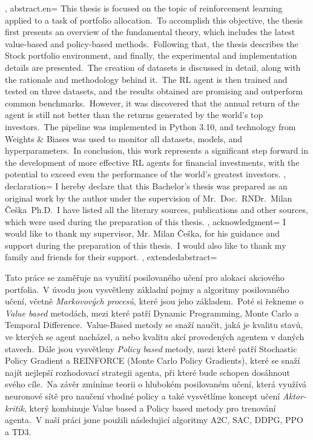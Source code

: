 {{    }, %
    abstract.en={
        This thesis is focused on the topic of reinforcement learning applied to a task of portfolio allocation.\ To accomplish this objective, the thesis first presents an overview of the fundamental theory, which includes the latest value-based and policy-based methods.\ Following that, the thesis describes the Stock portfolio environment, and finally, the experimental and implementation details are presented.\ The creation of datasets is discussed in detail, along with the rationale and methodology behind it.\ The RL agent is then trained and tested on three datasets, and the results obtained are promising and outperform common benchmarks.\ However, it was discovered that the annual return of the agent is still not better than the returns generated by the world's top investors.\ The pipeline was implemented in Python 3.10, and technology from Weights \& Biases was used to monitor all datasets, models, and hyperparameters.\ In conclusion, this work represents a significant step forward in the development of more effective RL agents for financial investments, with the potential to exceed even the performance of the world's greatest investors.
    }, %
    declaration={
        I hereby declare that this Bachelor's thesis was prepared as an original work by the author under the supervision of Mr.~Doc.~RNDr.~Milan Češka~Ph.D.\ I have listed all the literary sources, publications and other sources, which were used during the preparation of this thesis.
    },
%
    acknowledgment={
        I would like to thank my supervisor, Mr. Milan Češka, for his guidance and support during the preparation of this thesis.\ I would also like to thank my family and friends for their support.
    },
%
    extendedabstract={ %
        Tato práce se zaměřuje na využití posilovaného učení pro alokaci akciového portfolia.\ V úvodu jsou vysvětleny základní pojmy a algoritmy posilovaného učení, včetně \emph{Markovových procesů}, které jsou jeho základem.\ Poté si řekneme o \emph{Value based} metodách, mezi které patří Dynamic Programming, Monte Carlo a Temporal Difference.\ Value-Based metody se snaží naučit, jaká je kvalitu stavů, ve kterých se agent nacházel, a nebo kvalitu akcí provedených agentem v daných stavech.\ Dále jsou vysvětleny \emph{Policy based} metody, mezi které patří Stochastic Policy Gradient a REINFORCE (Monte Carlo Policy Gradients), které se snaží najít nejlepší rozhodovací strategii agenta, při které bude schopen dosáhnout svého cíle.\ Na závěr zmíníme teorii o hlubokém posilovaném učení, která využívá neuronové sítě pro naučení vhodné policy a také vysvětlíme koncept učení \emph{Aktor-kritik}, který kombinuje Value based a Policy based metody pro trenování agenta.\ V naší práci jsme použili následujicí algoritmy A2C, SAC, DDPG, PPO a TD3.

}}
